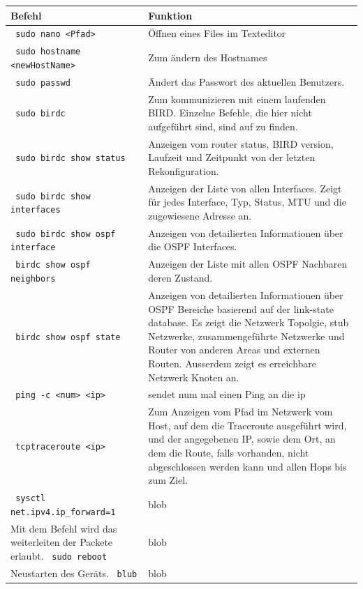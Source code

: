 \documentclass[11pt,titlepage]{article}
\begin{document}
\begin{tabular}{ |p{4cm}|p{10cm}|}
  \hline
  \textbf{Befehl} & \textbf{Funktion} \\
  \hline
  \lstinline! sudo nano <Pfad> ! & Öffnen eines Files im Texteditor \\
  \hline
  \lstinline! sudo hostname <newHostName>! & Zum ändern des Hostnames \\
  \hline
  \lstinline! sudo passwd! & Ändert das Passwort des aktuellen Benutzers. \\
  \hline
  \lstinline! sudo birdc ! & Zum kommunizieren mit einem laufenden BIRD. Einzelne Befehle, die hier nicht aufgeführt sind, sind auf \cite{BIRD_COMMAND} zu finden. \\
  \hline
  \lstinline! sudo birdc show status ! & Anzeigen vom router status, BIRD version, Laufzeit und Zeitpunkt von der letzten Rekonfiguration. \\
  \hline
  \lstinline! sudo birdc show interfaces ! & Anzeigen der Liste von allen Interfaces. Zeigt für jedes Interface, Typ, Status, MTU und die zugewiesene Adresse an.\\
  \hline
  \lstinline! sudo birdc show ospf interface ! & Anzeigen von detailierten Informationen über die OSPF Interfaces. \\
  \hline
  \lstinline! birdc show ospf neighbors ! & Anzeigen der Liste mit allen OSPF Nachbaren deren Zustand. \\
  \hline
  \lstinline! birdc show ospf state ! & Anzeigen von detailierten Informationen über OSPF Bereiche basierend auf der link-state database. Es zeigt die Netzwerk Topolgie, stub Netzwerke, zusammengeführte Netzwerke und Router von anderen Areas und externen Routen. Ausserdem zeigt es erreichbare Netzwerk Knoten an. \\
  \hline
  \lstinline! ping -c <num> <ip> ! & sendet num mal einen Ping an  die ip \\
  \hline
  \lstinline! tcptraceroute <ip> ! & Zum Anzeigen vom Pfad im Netzwerk vom Host, auf dem die Traceroute ausgeführt wird, und der angegebenen IP, sowie dem Ort, an dem die Route, falls vorhanden, nicht abgeschlossen werden kann und allen Hops bis zum Ziel. \\
  \hline
  \lstinline! sysctl net.ipv4.ip_forward=1 ! & blob \\ Mit dem Befehl wird das weiterleiten der Packete erlaubt.
  \hline
  \lstinline! sudo reboot ! & blob \\ Neustarten des Geräts.
  \hline
  \lstinline! blub ! & blob \\
  \hline
\end{tabular}
\end{document}
